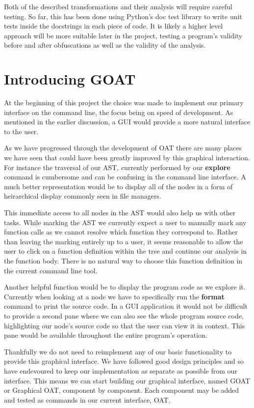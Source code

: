 \documentclass[twoside,a4paper]{report}
\begin{document}
Both of the described transformations and their analysis will require careful testing. So far,
this has been done using Python's doc test library to write unit tests inside the docstrings
in each piece of code. It is likely a higher level approach will be more suitable later in
the project, testing a program's validity before and after obfuscations as well as the validity
of the analysis.

\section{Introducing GOAT}

At the beginning of this project the choice was made to implement our primary interface on the command line, the focus being on speed of development. As
mentioned in the earlier discussion, a GUI would provide a more natural interface to the user.

As we have progressed through the development of OAT there are many places we have seen that could have been greatly improved by this graphical interaction.
For instance the traversal of our AST, currently performed by our \textbf{explore} command is cumbersome and can be confusing in the command line interface. A
much better representation would be to display all of the nodes in a form of heirarchical display commonly seen in file managers.

This immediate access to all nodes in the AST would also help us with other tasks. While marking the AST we currently expect a user to manually mark any function
calls as we cannot resolve which function they correspond to. Rather than leaving the marking entirely up to a user, it seems reasonable to allow the user to
click on a function definition within the tree and continue our analysis in the function body. There is no natural way to choose this function definition
in the current command line tool.

Another helpful function would be to display the program code as we explore it. Currently when looking at a node we have to specifically run the \textbf{format}
command to print the source code. In a GUI application it would not be difficult to provide a second pane where we can also see the whole program source code,
highlighting our node's source code so that the user can view it in context. This pane would be available throughout the entire program's operation.

Thankfully we do not need to reimplement any of our basic functionality to provide this graphical interface. We have followed good design principles and so have
endevoured to keep our implementation as separate as possible from our interface. This means we can start building our graphical interface, named GOAT or
Graphical OAT, component by component. Each component may be added and tested as commands in our current interface, OAT.
\end{document}
